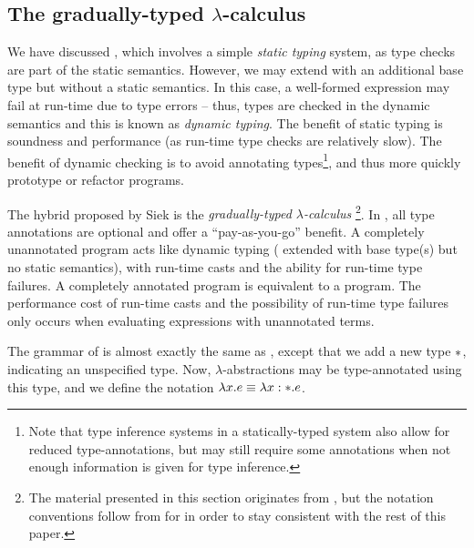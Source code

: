 
\subsection{The gradually-typed $\lambda$-calculus}
\label{sec:gradual}


We have discussed \stlc{}, which involves a simple \textit{static typing} system, as type checks are part of the static semantics. However, we may extend \ulc{} with an additional base type but without a static semantics. In this case, a well-formed expression may fail at run-time due to type errors -- thus, types are checked in the dynamic semantics and this is known as \textit{dynamic typing}. The benefit of static typing is soundness and performance (as run-time type checks are relatively slow). The benefit of dynamic checking is to avoid annotating types\footnote{Note that type inference systems in a statically-typed system also allow for reduced type-annotations, but may still require some annotations when not enough information is given for type inference.}, and thus more quickly prototype or refactor programs.

The hybrid proposed by Siek is the \textit{gradually-typed $\lambda$-calculus} \gtlc{} \cite{Siek06gradualtyping,siek2015refined}\footnote{The material presented in this section originates from \cite{Siek06gradualtyping,siek2015refined}, but the notation conventions follow from \cite{conf/popl/HazelnutLive19} for in order to stay consistent with the rest of this paper.}. In \gtlc{}, all type annotations are optional and offer a ``pay-as-you-go'' benefit. A completely unannotated \gtlc{} program acts like dynamic typing (\ulc{} extended with base type(s) but no static semantics), with run-time casts and the ability for run-time type failures. A completely annotated \gtlc{} program is equivalent to a \stlc{} program. The performance cost of run-time casts and the possibility of run-time type failures only occurs when evaluating expressions with unannotated terms.

The grammar of \gtlc{} is almost exactly the same as \stlc, except that we add a new type $*$, indicating an unspecified type. Now, $\lambda$-abstractions may be type-annotated using this type, and we define the notation $\lambda x.e\equiv\lambda x:*.e$.

